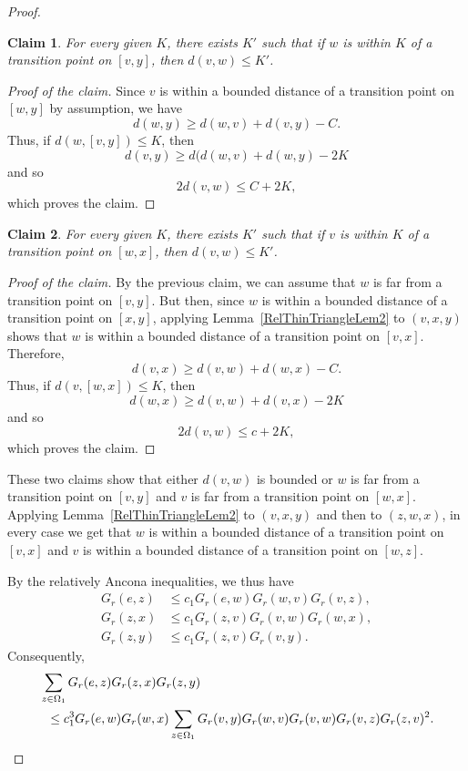 \documentclass{amsart}
\newtheorem*{claim}{Claim}
\theoremstyle{definition}
\theoremstyle{remark}
\begin{document}
\begin{proof}
\begin{claim}
For every given $K$, there exists $K'$ such that if $w$ is within $K$ of a transition point on $[v,y]$, then $d(v,w)\leq K'$.
\end{claim}

\begin{proof}[Proof of the claim]
Since $v$ is within a bounded distance of a transition point on $[w,y]$ by assumption, we have
$$d(w,y)\geq d(w,v)+d(v,y)-C.$$
Thus, if $d(w,[v,y])\leq K$, then
$$d(v,y)\geq d(d(w,v)+d(w,y)-2K$$
and so
$$2d(v,w)\leq C+2K,$$
which proves the claim.
\end{proof}

\begin{claim}
For every given $K$, there exists $K'$ such that if $v$ is within $K$ of a transition point on $[w,x]$, then $d(v,w)\leq K'$.
\end{claim}

\begin{proof}[Proof of the claim]
By the previous claim, we can assume that $w$ is far from a transition point on $[v,y]$.
But then, since $w$ is within a bounded distance of a transition point on $[x,y]$, applying Lemma~\ref{RelThinTriangleLem2} to $(v,x,y)$ shows that $w$ is within a bounded distance of a transition point on $[v,x]$.
Therefore,
$$d(v,x)\geq d(v,w)+d(w,x)-C.$$
Thus, if $d(v,[w,x])\leq K$, then
$$d(w,x)\geq d(v,w)+d(v,x)-2K$$
and so
$$2d(v,w)\leq c+2K,$$
which proves the claim.
\end{proof}

These two claims show that either $d(v,w)$ is bounded or
$w$ is far from a transition point on $[v,y]$ and $v$ is far from a transition point on $[w,x]$.
Applying Lemma~\ref{RelThinTriangleLem2} to $(v,x,y)$ and then to $(z,w,x)$, in every case we get that
$w$ is within a bounded distance of a transition point on $[v,x]$ and $v$ is within a bounded distance of a transition point on $[w,z]$.

By the relatively Ancona inequalities, we thus have
  \begin{align*}
    G_r(e, z) &\leq c_1 G_r(e, w) G_r(w, v) G_r(v, z), \\
    G_r(z, x) &\leq c_1 G_r(z, v) G_r(v, w) G_r(w, x), \\
    G_r(z, y) &\leq c_1 G_r(z, v) G_r(v, y). 
  \end{align*}
Consequently,
  \begin{align*}
&\sum_{z \in \Omega_1} G_r(e, z) G_r(z, x) G_r(z, y) \\
    &\hspace{.2cm}\leq
    c_1^3 G_r(e, w) G_r(w, x) \sum_{z \in \Omega_1} G_r(v, y) G_r(w, v)G_r(v,w) G_r(v, z)G_r(z,v)^2. 
  \end{align*}
    

\end{proof}
\end{document}
